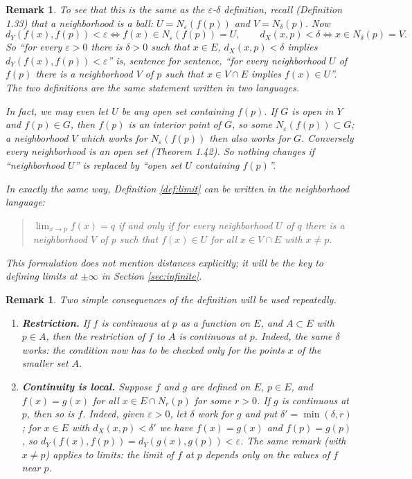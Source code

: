 \documentclass{article}
\theoremstyle{mythm}
\newtheorem{remark}[theorem]{Remark}
\begin{document}
\begin{remark}
To see that this is the same as the $\varepsilon$-$\delta$ definition, recall (Definition 1.33) that a neighborhood is a ball: $U = N_\varepsilon(f(p))$ and $V = N_\delta(p)$. Now
\[
d_Y(f(x), f(p)) < \varepsilon \iff f(x) \in N_\varepsilon(f(p)) = U, \qquad d_X(x,p) < \delta \iff x \in N_\delta(p) = V.
\]
So ``for every $\varepsilon > 0$ there is $\delta > 0$ such that $x \in E$, $d_X(x,p) < \delta$ implies $d_Y(f(x), f(p)) < \varepsilon$'' is, sentence for sentence, ``for every neighborhood $U$ of $f(p)$ there is a neighborhood $V$ of $p$ such that $x \in V \cap E$ implies $f(x) \in U$''. The two definitions are the same statement written in two languages.

In fact, we may even let $U$ be \textit{any open set} containing $f(p)$. If $G$ is open in $Y$ and $f(p) \in G$, then $f(p)$ is an interior point of $G$, so some $N_\varepsilon(f(p)) \subset G$; a neighborhood $V$ which works for $N_\varepsilon(f(p))$ then also works for $G$. Conversely every neighborhood is an open set (Theorem 1.42). So nothing changes if ``neighborhood $U$'' is replaced by ``open set $U$ containing $f(p)$''.

In exactly the same way, Definition \ref{def:limit} can be written in the neighborhood language:
\begin{quote}
\textit{$\lim_{x\to p} f(x) = q$ if and only if for every neighborhood $U$ of $q$ there is a neighborhood $V$ of $p$ such that $f(x) \in U$ for all $x \in V \cap E$ with $x \neq p$.}
\end{quote}
This formulation does not mention distances explicitly; it will be the key to defining limits at $\pm\infty$ in Section \ref{sec:infinite}.
\end{remark}

\begin{remark}\label{rem:local}
Two simple consequences of the definition will be used repeatedly.
\begin{enumerate}[label=(\alph*)]
    \item \textbf{Restriction.} If $f$ is continuous at $p$ as a function on $E$, and $A \subset E$ with $p \in A$, then the restriction of $f$ to $A$ is continuous at $p$. Indeed, the same $\delta$ works: the condition now has to be checked only for the points $x$ of the smaller set $A$.
    \item \textbf{Continuity is local.} Suppose $f$ and $g$ are defined on $E$, $p \in E$, and $f(x) = g(x)$ for all $x \in E \cap N_r(p)$ for some $r > 0$. If $g$ is continuous at $p$, then so is $f$. Indeed, given $\varepsilon > 0$, let $\delta$ work for $g$ and put $\delta' = \min(\delta, r)$; for $x \in E$ with $d_X(x,p) < \delta'$ we have $f(x) = g(x)$ and $f(p) = g(p)$, so $d_Y(f(x), f(p)) = d_Y(g(x), g(p)) < \varepsilon$. The same remark (with $x \neq p$) applies to limits: the limit of $f$ at $p$ depends only on the values of $f$ near $p$.
\end{enumerate}
\end{remark}
\end{document}
